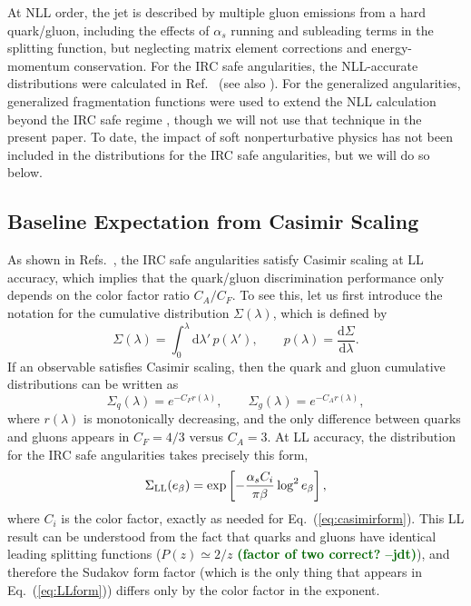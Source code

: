 \documentclass[11pt,letterpaper]{article}
\newcommand{\df}{\text{d}}
\DeclareRobustCommand{\Eq}[1]{Eq.~(\ref{#1})}
\DeclareRobustCommand{\Ref}[1]{Ref.~\cite{#1}}
\DeclareRobustCommand{\Refs}[1]{Refs.~\cite{#1}}
\newcommand{\be}{\begin{equation}}
\newcommand{\ee}{\end{equation}}
\newcommand{\jdt}[1]{\textbf{\textcolor{darkgreen}{(#1 --jdt)}}}
\begin{document}
At NLL order, the jet is described by multiple gluon emissions from a hard quark/gluon, including the effects of $\alpha_s$ running and subleading terms in the splitting function, but neglecting matrix element corrections and energy-momentum conservation.  For the IRC safe angularities, the NLL-accurate distributions were calculated in \Ref{} (see also \cite{}).  For the generalized angularities, generalized fragmentation functions \cite{} were used to extend the NLL calculation beyond the IRC safe regime \cite{}, though we will not use that technique in the present paper.  To date, the impact of soft nonperturbative physics has not been included in the distributions for the IRC safe angularities, but we will do so below.  

\subsection{Baseline Expectation from Casimir Scaling}

As shown in \Refs{}, the IRC safe angularities satisfy Casimir scaling at LL accuracy, which implies that the quark/gluon discrimination performance only depends on the color factor ratio $C_A/C_F$.  To see this, let us first introduce the notation for the cumulative distribution $\Sigma(\lambda)$, which is defined by
\be
\Sigma(\lambda) = \int_0^\lambda \df \lambda' \, p(\lambda'), \qquad p(\lambda) = \frac{\df \Sigma}{\df \lambda}.
\ee
If an observable satisfies Casimir scaling, then the quark and gluon cumulative distributions can be written as
\be
\label{eq:casimirform}
\Sigma_q(\lambda) = e^{-C_F r(\lambda)}, \qquad \Sigma_g(\lambda) = e^{-C_A r(\lambda)},
\ee
where $r(\lambda)$ is monotonically decreasing, and the only difference between quarks and gluons appears in $C_F = 4/3$ versus $C_A = 3$.  At LL accuracy, the distribution for the IRC safe angularities takes precisely this form,
\be
\label{eq:LLform}
\Sigma_{\rm LL}(e_\beta) = \exp \left[ - \frac{\alpha_s C_i}{\pi \beta} \log^2 e_\beta  \right],
\ee
where $C_i$ is the color factor, exactly as needed for \Eq{eq:casimirform}.  This LL result can be understood from the fact that quarks and gluons have identical leading splitting functions ($P(z) \simeq 2/z$ \jdt{factor of two correct?}), and therefore the Sudakov form factor (which is the only thing that appears in \Eq{eq:LLform}) differs only by the color factor in the exponent.
\end{document}
